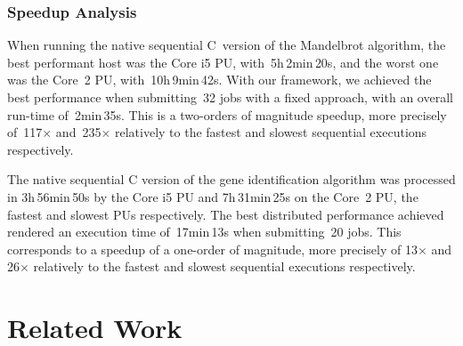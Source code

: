 \documentclass[runningheads,a4paper]{llncs}
\newcommand{\td}[1]{\todo[inline]{#1}}
\begin{document}
\subsubsection{Speedup Analysis}

When running the native sequential C~version of the Mandelbrot algorithm, the best performant host was the Core i5 PU, with~5h$\,$2min$\,$20s, and the worst one was the Core~2 PU, with~10h$\,$9min$\,$42s. With our framework, we achieved the best performance when submitting~32 jobs with a fixed approach, with an overall run-time of~2min$\,$35s. This is a two-orders of magnitude speedup, more precisely of~117$\times$ and~235$\times$ relatively to the fastest and slowest sequential executions respectively.





The native sequential C version of the gene identification algorithm was processed in 3h$\,$56min$\,$50s by the Core i5 PU and 7h$\,$31min$\,$25s on the Core~2 PU, the fastest and slowest PUs respectively.
The best distributed performance achieved rendered an execution time of~17min$\,$13s when submitting~20 jobs. This corresponds to a speedup of a one-order of magnitude, more precisely of 13$\times$ and 26$\times$ relatively to the fastest and slowest sequential executions respectively.



\section{Related Work}
\label{sec:related_work}



\end{document}
